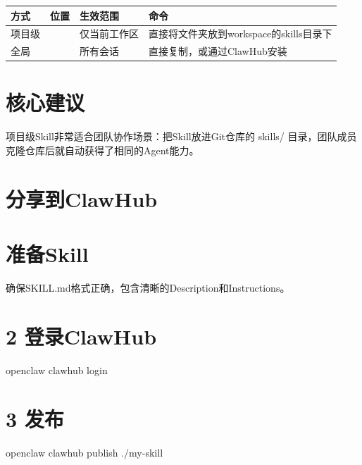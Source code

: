 \documentclass[
  10
]{article}
\newenvironment{Shaded}{}{}
\newcommand{\NormalTok}[1]{#1}
\newcounter{none} %
\begin{document}
{\def\LTcaptype{none} %
\begin{longtable}[]{@{}|l|l|l|l|@{}}
\toprule\noalign{}
\endhead
\bottomrule\noalign{}
\endlastfoot
\hline
方式 & 位置 & 生效范围 & 命令 \\
\hline
项目级 & & 仅当前工作区 & 直接将文件夹放到workspace的skills目录下 \\
\hline
全局 & & 所有会话 & 直接复制，或通过ClawHub安装 \\
\hline
\end{longtable}
}

\section{核心建议}\label{ux6838ux5fc3ux5efaux8bae-15}

项目级Skill非常适合团队协作场景：把Skill放进Git仓库的 skills/
目录，团队成员克隆仓库后就自动获得了相同的Agent能力。

\section{分享到ClawHub}\label{ux5206ux4eabux5230clawhub}

\section{准备Skill}\label{ux51c6ux5907skill}

确保SKILL.md格式正确，包含清晰的Description和Instructions。

\section{2 登录ClawHub}\label{ux767bux5f55clawhub}

\begin{Shaded}
\begin{Highlighting}[]
\NormalTok{openclaw clawhub login}
\end{Highlighting}
\end{Shaded}

\section{3 发布}\label{ux53d1ux5e03}

\begin{Shaded}
\begin{Highlighting}[]
\NormalTok{openclaw clawhub publish ./my{-}skill}
\end{Highlighting}
\end{Shaded}
\end{document}
